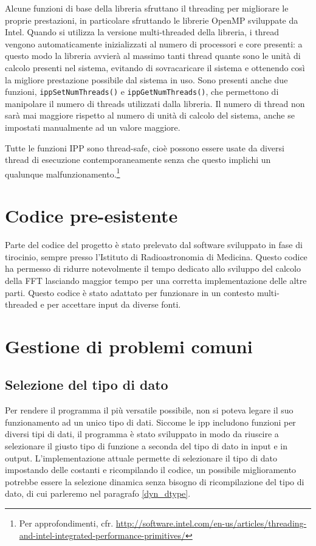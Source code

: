 Alcune funzioni di base della libreria sfruttano il threading per migliorare le
proprie prestazioni, in particolare sfruttando le librerie OpenMP sviluppate da
Intel. Quando si utilizza la versione multi-threaded della libreria, i thread
vengono automaticamente inizializzati al numero di processori e core presenti: a
questo modo la libreria avvier\`a al massimo tanti thread quante sono le unit\`a
di calcolo presenti nel sistema, evitando di sovracaricare il sistema e
ottenendo cos\`i la migliore prestazione possibile dal sistema in uso. Sono
presenti anche due funzioni, \texttt{ippSetNumThreads()} e
\texttt{ippGetNumThreads()}, che permettono di manipolare il numero di threads
utilizzati dalla libreria. Il numero di thread non sar\`a mai maggiore rispetto
al numero di unit\`a di calcolo del sistema, anche se impostati manualmente ad
un valore maggiore.

Tutte le funzioni IPP sono thread-safe, cio\`e possono essere usate da diversi
thread di esecuzione contemporaneamente senza che questo implichi un qualunque
malfunzionamento.\footnote{Per approfondimenti, cfr.
\url{http://software.intel.com/en-us/articles/threading-and-intel-integrated-performance-primitives/}}


\section{Codice pre-esistente}
Parte del codice del progetto \`e stato prelevato dal software sviluppato in
fase di tirocinio, sempre presso l'Istituto di Radioastronomia di Medicina.
Questo codice ha permesso di ridurre notevolmente il tempo dedicato allo
sviluppo del calcolo della \ac{FFT} lasciando maggior tempo per una corretta
implementazione delle altre parti. Questo codice \`e stato adattato per
funzionare in un contesto multi-threaded e per accettare input da diverse fonti.

\section{Gestione di problemi comuni}
\subsection{Selezione del tipo di dato}
Per rendere il programma il pi\`u versatile possibile, non si poteva legare il
suo funzionamento ad un unico tipo di dati. Siccome le \ac{ipp} includono
funzioni per diversi tipi di dati, il programma \`e stato sviluppato in modo da
riuscire a selezionare il giusto tipo di funzione a seconda del tipo di dato in
input e in output. L'implementazione attuale permette di selezionare il tipo di
dato impostando delle costanti e ricompilando il codice, un possibile
miglioramento potrebbe essere la selezione dinamica senza bisogno di
ricompilazione del tipo di dato, di cui parleremo nel paragrafo \ref{dyn_dtype}.

